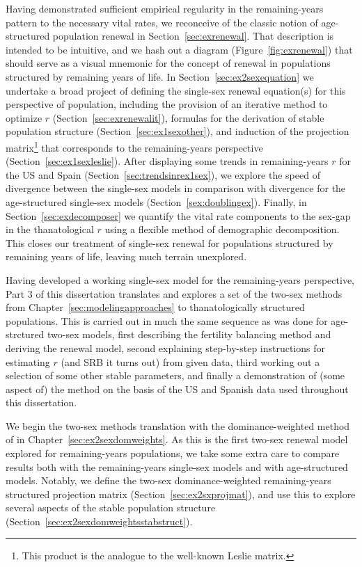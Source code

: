 Having demonstrated sufficient empirical regularity in the remaining-years
pattern to the necessary vital rates, we reconceive of the classic notion of
age-structured population renewal in Section~\ref{sec:exrenewal}. That
description is intended to be intuitive, and we hash out a diagram
(Figure~\ref{fig:exrenewal}) that should serve as a visual mnemonic for the 
concept of renewal in populations structured by remaining years of life. In
Section~\ref{sec:ex2sexequation} we undertake a broad project of defining the
single-sex renewal equation(s) for this perspective of population, including the
provision of an iterative method to optimize $r$
(Section~\ref{sec:exrenewalit}), formulas for the derivation of stable
population structure (Section~\ref{sec:ex1sexother}), and induction of the
projection matrix\footnote{This product is the analogue to the well-known Leslie
matrix.} that corresponds to the remaining-years perspective 
(Section~\ref{sec:ex1sexleslie}). After displaying some trends in
remaining-years $r$ for the US and Spain (Section~\ref{sec:trendsinrex1sex}),
 we explore the speed of divergence between the single-sex models in comparison with divergence for the age-structured
single-sex models (Section~\ref{sex:doublingex}). Finally, in
Section~\ref{sec:exdecomposer} we quantify the vital rate components to the
sex-gap in the thanatological $r$ using a flexible method of demographic
decomposition. This closes our treatment of single-sex renewal for populations
structured by remaining years of life, leaving much terrain unexplored.

Having developed a working single-sex model for the remaining-years perspective,
Part 3 of this dissertation translates and explores a set of the two-sex
methods from Chapter~\ref{sec:modelingapproaches} to thanatologically
structured populations. This is carried out in much the same sequence as was
done for age-strctured two-sex models, first describing the fertility
balancing method and deriving the renewal model, second explaining step-by-step
instructions for estimating $r$ (and SRB it turns out) from given data, third
working out a selection of some other stable parameters, and
finally a demonstration of (some aspect of) the method on the basis of the US
and Spanish data used throughout this dissertation.

We begin the two-sex methods translation with the
dominance-weighted method of \citet{goodman1967age} in
Chapter~\ref{sec:ex2sexdomweights}. As this is the first two-sex renewal model
explored for remaining-years populations, we take some extra care to compare
results both with the remaining-years single-sex models and with age-structured models. Notably, we
define the two-sex dominance-weighted remaining-years structured
projection matrix (Section~\ref{sec:ex2sxprojmat}), and use this to explore
several aspects of the stable population structure
(Section~\ref{sec:ex2sexdomweightsstabstruct}). 

